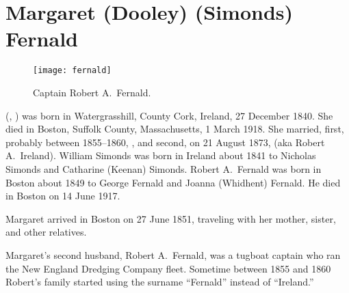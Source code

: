 \section{Margaret (Dooley) (Simonds) Fernald}\label{per:Margaret3Dooley}

\begin{figure}[htbp]
	\centering
	\texttt{[image: fernald]}
	\caption{Captain Robert A.\ Fernald.}
	\label{fig:RobertFernald}
\end{figure}

 (, ) was born in Watergrasshill, County Cork, Ireland, 27 December 1840.\cite{Margaret3DooleyBaptism:2} She died in Boston, Suffolk County, Massachusetts, 1 March 1918.\cite{Margaret3DooleyDeath} She married, first, probably between 1855--1860, ,\cite{WilliamSimondsMarriage} and second, on 21 August 1873, \cite{RobertFernaldMarriage:2} (aka Robert A.\ Ireland).\cite{Census1855RobertFernald:1} William Simonds was born in Ireland about 1841\cite{Census1855WilliamSimonds} to Nicholas Simonds and Catharine (Keenan) Simonds.\cite{WilliamSimondsDeath,CatharineSimondsDeath} Robert A.\ Fernald was born in Boston about 1849 to George Fernald and Joanna (Whidhent) Fernald.\cite{RobertFernaldMarriage:3,JoannaFernaldDeath} He died in Boston on 14 June 1917.\cite{RobertFernaldDeath:1}

Margaret arrived in Boston on 27 June 1851, traveling with her mother, sister, and other relatives.\cite{Chascay:9}

Margaret's second husband, Robert A.\ Fernald, was a tugboat captain who ran the New England Dredging Company fleet.\cite{RobertFernaldDeath:2} Sometime between 1855 and 1860 Robert's family started using the surname ``Fernald'' instead of ``Ireland.''\cite{Census1855RobertFernald:2,Census1860RobertFernald}

